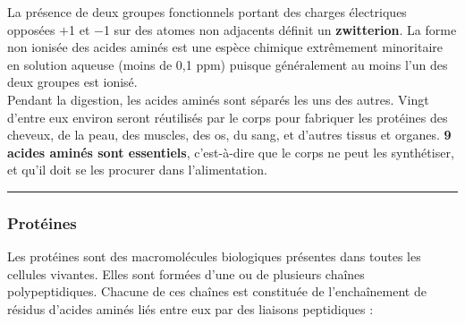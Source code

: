 \documentclass{article}
\begin{document}
La présence de deux groupes fonctionnels portant des charges électriques opposées $+$1 et $-$1 sur des atomes non adjacents définit un \textbf{zwitterion}. La forme non ionisée des acides aminés est une espèce chimique extrêmement minoritaire en solution aqueuse (moins de 0,1 ppm) puisque généralement au moins l'un des deux groupes est ionisé.\\ 

Pendant la digestion, les acides aminés sont séparés les uns des autres. Vingt d'entre eux environ seront réutilisés par le corps pour fabriquer les protéines des cheveux, de la peau, des muscles, des os, du sang, et d'autres tissus et organes. \textbf{9 acides aminés sont essentiels}, c'est-à-dire que le corps ne peut les synthétiser, et qu'il doit se les procurer dans l'alimentation.

\rule{\linewidth}{0.2mm}

\subsubsection*{Protéines}

Les protéines sont des macromolécules biologiques présentes dans toutes les cellules vivantes. Elles sont formées d'une ou de plusieurs chaînes polypeptidiques. Chacune de ces chaînes est constituée de l'enchaînement de résidus d'acides aminés liés entre eux par des liaisons peptidiques :
\end{document}
